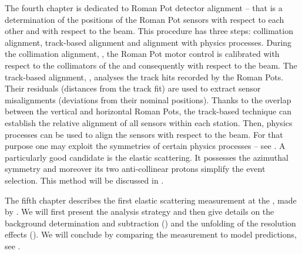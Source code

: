 The fourth chapter is dedicated to Roman Pot detector alignment -- that is a determination of the positions of the Roman Pot sensors with respect to each other and with respect to the beam. This procedure has three steps: collimation alignment, track-based alignment and alignment with physics processes. During the collimation alignment, , the Roman Pot motor control is calibrated with respect to the collimators of the  and consequently with respect to the beam. The track-based alignment, , analyses the track hits recorded by the Roman Pots. Their residuals (distances from the track fit) are used to extract sensor misalignments (deviations from their nominal positions). Thanks to the overlap between the vertical and horizontal Roman Pots, the track-based technique can establish the relative alignment of all sensors within each station. Then, physics processes can be used to align the sensors with respect to the beam. For that purpose one may exploit the symmetries of certain physics processes -- see . A particularly good candidate is the elastic scattering. It possesses the azimuthal symmetry and moreover its two anti-collinear protons
simplify the event selection. This method will be discussed in .

The fifth chapter describes the first elastic scattering measurement at the , made by . We will first present the analysis strategy and then give details on the background determination and subtraction () and the unfolding of the resolution effects (). We will conclude by comparing the measurement to model predictions, see .




\def\CaptionPrefix{\currentChapterNumber.}
